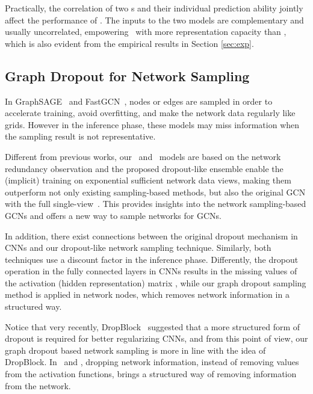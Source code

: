 {{Practically, the correlation of two \drop s and their individual prediction ability jointly affect the performance of \dm. 
The inputs to the two models are complementary  and usually uncorrelated, empowering \dm\ with more representation capacity than \drop, which is also evident from the empirical results in Section \ref{sec:exp}.  



\subsection{ Graph Dropout for Network Sampling}
In GraphSAGE~\cite{hamilton2017inductive} and FastGCN~\cite{chen2018fastgcn}, 
nodes or edges are sampled in order to accelerate training, avoid overfitting, and make the network data regularly like grids. However in the inference phase, these models may miss information when the sampling result is not representative. 

Different from previous works, our \drop\ and \dm\ models are based on the network redundancy observation and the proposed dropout-like ensemble enable the (implicit) training on exponential sufficient network data views, making them outperform not only existing sampling-based methods, but also the original GCN with the full single-view~\cite{kipf2016semi}. 
This provides 
insights into the network sampling-based GCNs and offers a new way to sample networks for GCNs.



In addition, there exist connections between the original dropout mechanism in CNNs and our dropout-like network sampling technique. 
Similarly, both techniques use a discount factor in the inference phase. 
Differently, the dropout operation in the fully connected layers in CNNs results in the missing values of the activation (hidden representation) matrix , while our graph dropout sampling method is applied in network nodes, which removes network information in a structured way. 

Notice that very recently, DropBlock~\cite{ghiasi2018dropblock} suggested that a more structured form of dropout is required for better regularizing CNNs, and from this point of view, our graph dropout based network sampling is more in line with the idea of DropBlock. In \drop\ and \dm, dropping network information, instead of removing values from the activation functions, brings a structured way of removing information from the network. 
}






}







